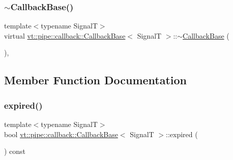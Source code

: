 \mbox{\label{structvt_1_1pipe_1_1callback_1_1_callback_base_adc39148be97af3105f9b5765431bdc9a}} 
\subsubsection{\texorpdfstring{$\sim$\+Callback\+Base()}{~CallbackBase()}}
{\footnotesize\ttfamily template$<$typename SignalT$>$ \\
virtual \hyperlink{structvt_1_1pipe_1_1callback_1_1_callback_base}{vt\+::pipe\+::callback\+::\+Callback\+Base}$<$ SignalT $>$\+::$\sim$\hyperlink{structvt_1_1pipe_1_1callback_1_1_callback_base}{Callback\+Base} (\begin{DoxyParamCaption}{ }\end{DoxyParamCaption})\hspace{0.3cm}{\ttfamily [virtual]}, {\ttfamily [default]}}



\subsection{Member Function Documentation}
\mbox{\label{structvt_1_1pipe_1_1callback_1_1_callback_base_a9ef1595197b291a660e6d19aadb0203e}} 
\subsubsection{\texorpdfstring{expired()}{expired()}}
{\footnotesize\ttfamily template$<$typename SignalT$>$ \\
bool \hyperlink{structvt_1_1pipe_1_1callback_1_1_callback_base}{vt\+::pipe\+::callback\+::\+Callback\+Base}$<$ SignalT $>$\+::expired (\begin{DoxyParamCaption}{ }\end{DoxyParamCaption}) const\hspace{0.3cm}{\ttfamily [inline]}}

